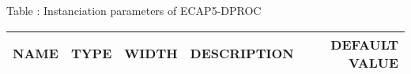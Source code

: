 {
  \vspace{0.5em}
  \begin{center}
    Table \thetable: Instanciation parameters of ECAP5-DPROC\label{tab:instanciation-parameters}
  \end{center}

\footnotesize
\begin{xltabular}{0.9\textwidth}{|l|c|c|X|r|}
  \hline
  \textbf{NAME} & \textbf{TYPE} & \textbf{WIDTH} & \textbf{DESCRIPTION} & \textbf{DEFAULT VALUE} \\
  \hline
  \hline
\end{xltabular}
}
